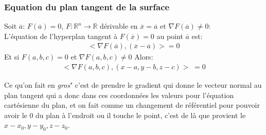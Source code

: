 \subsubsection{Equation du plan tangent de la surface}
\begin{definition}
    Soit $\overline{a}$: $F( \overline{a}) = 0$, $F: \mathbb{R}^n  \to \mathbb{R}$ dérivable en $\overline{x} = \overline{a}$ et $ \nabla F( \overline{a}) \neq 0$:\\
   L'équation de l'hyperplan tangent à $F( \overline{x}) = 0$ au point $\overline{a}$ est:
   \begin{align*}
       < \nabla F( \overline{a}),  ( \overline{x} - \overline{a})> =  0
   \end{align*}
   Et si $F(a, b, c) = 0$ et $ \nabla F(a, b, c) \neq 0$ Alors:
   \begin{align*}
       < \nabla F(a, b, c), (x-a, y-b, z-c) >\; = 0
   \end{align*}
   
\end{definition}
\begin{framedremark}
    Ce qu'on fait en \textit{gros}" c'est de prendre le gradient qui donne le vecteur normal au plan tangent qui a donc dans ces coordonnées les valeurs pour l'équation cartésienne du plan, et on fait comme un changement de référentiel pour pouvoir avoir le $0$ du plan à l'endroit ou il touche le point, c'est de là que provient le $x - x_0, y - y_0, z - z_0$.
\end{framedremark}





